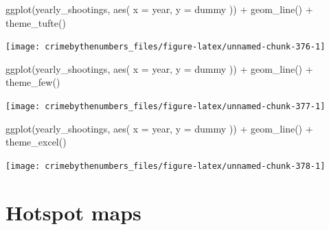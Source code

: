 \documentclass[
  a4paper,
]{krantz}
\makeatletter
\newenvironment{Shaded}{\begin{snugshade}}{\end{snugshade}}
\newcommand{\AttributeTok}[1]{\textcolor[rgb]{0.77,0.63,0.00}{#1}}
\newcommand{\FunctionTok}[1]{\textcolor[rgb]{0.00,0.00,0.00}{#1}}
\newcommand{\NormalTok}[1]{#1}
\newcommand{\SpecialCharTok}[1]{\textcolor[rgb]{0.00,0.00,0.00}{#1}}
\newenvironment{kframe}{%
\medskip{}
\setlength{\fboxsep}{.8em}
 \def\at@end@of@kframe{}%
 \ifinner\ifhmode%
  \def\at@end@of@kframe{\end{minipage}}%
  \begin{minipage}{\columnwidth}%
 \fi\fi%
 \def\FrameCommand##1{\hskip\@totalleftmargin \hskip-\fboxsep
 \colorbox{shadecolor}{##1}\hskip-\fboxsep
     \hskip-\linewidth \hskip-\@totalleftmargin \hskip\columnwidth}%
 \MakeFramed {\advance\hsize-\width
   \@totalleftmargin\z@ \linewidth\hsize
   \@setminipage}}%
 {\par\unskip\endMakeFramed%
 \at@end@of@kframe}
\renewenvironment{Shaded}{\begin{kframe}}{\end{kframe}}
\makeatother
\begin{document}
\begin{Shaded}
\begin{Highlighting}[]
\FunctionTok{ggplot}\NormalTok{(yearly\_shootings, }\FunctionTok{aes}\NormalTok{(}
  \AttributeTok{x =}\NormalTok{ year,}
  \AttributeTok{y =}\NormalTok{ dummy}
\NormalTok{)) }\SpecialCharTok{+}
  \FunctionTok{geom\_line}\NormalTok{() }\SpecialCharTok{+}
  \FunctionTok{theme\_tufte}\NormalTok{()}
\end{Highlighting}
\end{Shaded}

\begin{center}\texttt{[image: crimebythenumbers\_files/figure-latex/unnamed-chunk-376-1]} \end{center}

\begin{Shaded}
\begin{Highlighting}[]
\FunctionTok{ggplot}\NormalTok{(yearly\_shootings, }\FunctionTok{aes}\NormalTok{(}
  \AttributeTok{x =}\NormalTok{ year,}
  \AttributeTok{y =}\NormalTok{ dummy}
\NormalTok{)) }\SpecialCharTok{+}
  \FunctionTok{geom\_line}\NormalTok{() }\SpecialCharTok{+}
  \FunctionTok{theme\_few}\NormalTok{()}
\end{Highlighting}
\end{Shaded}

\begin{center}\texttt{[image: crimebythenumbers\_files/figure-latex/unnamed-chunk-377-1]} \end{center}

\begin{Shaded}
\begin{Highlighting}[]
\FunctionTok{ggplot}\NormalTok{(yearly\_shootings, }\FunctionTok{aes}\NormalTok{(}
  \AttributeTok{x =}\NormalTok{ year,}
  \AttributeTok{y =}\NormalTok{ dummy}
\NormalTok{)) }\SpecialCharTok{+}
  \FunctionTok{geom\_line}\NormalTok{() }\SpecialCharTok{+}
  \FunctionTok{theme\_excel}\NormalTok{()}
\end{Highlighting}
\end{Shaded}

\begin{center}\texttt{[image: crimebythenumbers\_files/figure-latex/unnamed-chunk-378-1]} \end{center}

\hypertarget{hotspot-maps}{%
\chapter{Hotspot maps}\label{hotspot-maps}}
\end{document}
